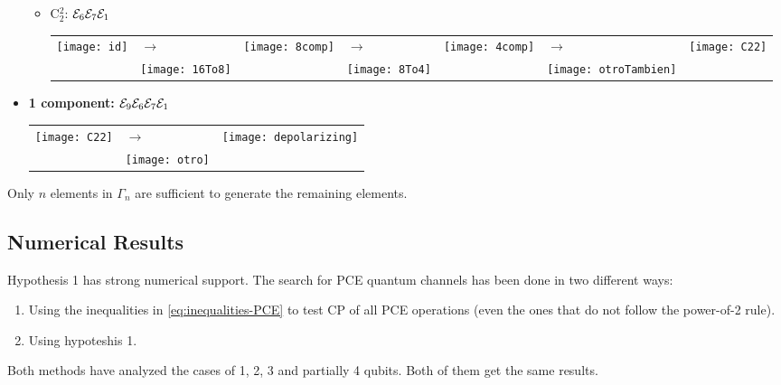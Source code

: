 \begin{itemize}
\begin{itemize}
\item C$_2^2$: $\mathcal{E}_6\mathcal{E}_7\mathcal{E}_1$\newline
\begin{tabular}{m{2cm} m{2cm} m{2cm} m{2cm} m{2cm} m{2cm} m{2cm}}
\texttt{[image: id]}  
& \hspace{0.8cm}$\longrightarrow$ 
& \texttt{[image: 8comp]} 
& \hspace{0.8cm}$\longrightarrow$ 
& \texttt{[image: 4comp]}
& \hspace{0.8cm}$\longrightarrow$ 
& \texttt{[image: C22]}\\ 
 & \texttt{[image: 16To8]} &  
 & \texttt{[image: 8To4]} &
 & \texttt{[image: otroTambien]}\\ 
\end{tabular}
\end{itemize}


\pagebreak
\item \textbf{1 component:} $\mathcal{E}_9\mathcal{E}_6\mathcal{E}_7\mathcal{E}_1$\newline
\begin{tabular}{m{2cm} m{2cm} m{2cm}}
\texttt{[image: C22]}
& \hspace{0.8cm}$\longrightarrow$ 
& \texttt{[image: depolarizing]} \\ 
 & \texttt{[image: otro]} &  \\ 
\end{tabular}
\end{itemize}

\begin{conj}
Only $n$ elements in $\Gamma_n$ are sufficient to generate the 
remaining elements.
\end{conj}
\subsection{Numerical Results} %
Hypothesis 1 has strong numerical support. The search for PCE quantum
channels has been done in two different ways:
\begin{enumerate}
\item Using the inequalities in \eqref{eq:inequalities-PCE} to test CP of 
all PCE operations (even the ones that do not follow the power-of-2 rule).
\item Using hypoteshis 1.
\end{enumerate}
Both methods have analyzed the cases of 1, 2, 3 and partially 4 qubits. 
Both of them get the same results. 

